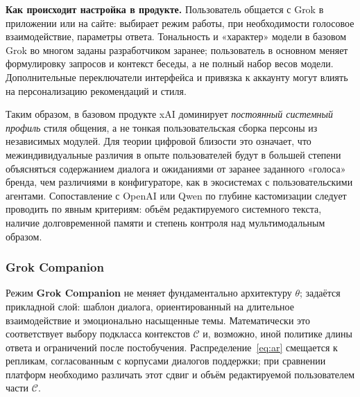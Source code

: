 \documentclass[areasetadvanced]{scrartcl}
\begin{document}
\textbf{Как происходит настройка в продукте.} Пользователь общается с Grok в приложении или на сайте: выбирает режим работы, при необходимости голосовое взаимодействие, параметры ответа. Тональность и «характер» модели в базовом Grok во многом заданы разработчиком заранее; пользователь в основном меняет формулировку запросов и контекст беседы, а не полный набор весов модели. Дополнительные переключатели интерфейса и привязка к аккаунту могут влиять на персонализацию рекомендаций и стиля.

Таким образом, в базовом продукте xAI доминирует \emph{постоянный системный профиль} стиля общения, а не тонкая пользовательская сборка персоны из независимых модулей. Для теории цифровой близости это означает, что межиндивидуальные различия в опыте пользователей будут в большей степени объясняться содержанием диалога и ожиданиями от заранее заданного «голоса» бренда, чем различиями в конфигураторе, как в экосистемах с пользовательскими агентами. Сопоставление с OpenAI или Qwen по глубине кастомизации следует проводить по явным критериям: объём редактируемого системного текста, наличие долговременной памяти и степень контроля над мультимодальным образом.

\subsubsection{Grok Companion}

Режим \textbf{Grok Companion} не меняет фундаментально архитектуру $\theta$; задаётся прикладной слой: шаблон диалога, ориентированный на длительное взаимодействие и эмоционально насыщенные темы. Математически это соответствует выбору подкласса контекстов $\mathcal{C}$ и, возможно, иной политике длины ответа и ограничений после постобучения. Распределение~\eqref{eq:ar} смещается к репликам, согласованным с корпусами диалогов поддержки; при сравнении платформ необходимо различать этот сдвиг и объём редактируемой пользователем части $\mathcal{C}$.
\end{document}
